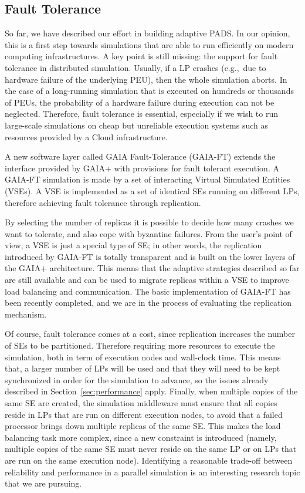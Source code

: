 \documentclass[1p]{elsarticle}
\begin{document}
\subsection{Fault Tolerance}

So far, we have described our effort in building adaptive PADS. In our
opinion, this is a first step towards simulations that are able to run
efficiently on modern computing infrastructures. A key point is still
missing: the support for fault tolerance in distributed
simulation. Usually, if a LP crashes (e.g.,~due to hardware failure of
the underlying PEU), then the whole simulation aborts. In the case of
a long-running simulation that is executed on hundreds or thousands of
PEUs, the probability of a hardware failure during execution can not
be neglected. Therefore, fault tolerance is essential, especially if
we wish to run large-scale simulations on cheap but unreliable
execution systems such as resources provided by a Cloud
infrastructure.

A new software layer called GAIA Fault-Tolerance (GAIA-FT) extends the
interface provided by GAIA+ with provisions for fault tolerant
execution. A GAIA-FT simulation is made by a set of interacting
Virtual Simulated Entities (VSEs). A VSE is implemented as a set of
identical SEs running on different LPs, therefore achieving fault
tolerance through replication.

By selecting the number of replicas it is possible to decide how many
crashes we want to tolerate, and also cope with byzantine
failures. From the user's point of view, a VSE is just a special type
of SE; in other words, the replication introduced by GAIA-FT is
totally transparent and is built on the lower layers of the GAIA+
architecture. This means that the adaptive strategies described so far
are still available and can be used to migrate replicas within a VSE
to improve load balancing and communication. The basic implementation
of GAIA-FT has been recently completed, and we are in the process of
evaluating the replication mechanism.

Of course, fault tolerance comes at a cost, since replication
increases the number of SEs to be partitioned. Therefore requiring
more resources to execute the simulation, both in term of execution
nodes and wall-clock time. This means that, a larger number of LPs
will be used and that they will need to be kept synchronized in order
for the simulation to advance, so the issues already described in
Section~\ref{sec:performance} apply. Finally, when multiple copies of
the same SE are created, the simulation middleware must ensure that
all copies reside in LPs that are run on different execution nodes, to
avoid that a failed processor brings down multiple replicas of the
same SE. This makes the load balancing task more complex, since a new
constraint is introduced (namely, multiple copies of the same SE must
never reside on the same LP or on LPs that are run on the same
execution node). Identifying a reasonable trade-off between
reliability and performance in a parallel simulation is an interesting
research topic that we are pursuing.
\end{document}
